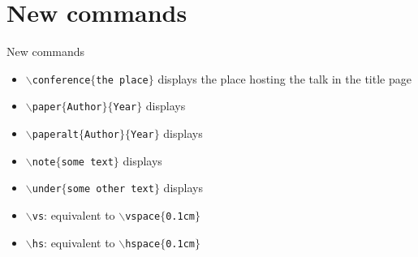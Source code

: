 \documentclass[10pt,numbering,toc,wide]{bpslides}
\begin{document}
\section{New commands}

\begin{frame}{New commands}
	\begin{itemize}
	\item \texttt{$\backslash$conference$\{$the place$\}$} displays the place hosting the talk in the title page
	\item \texttt{$\backslash$paper$\{$Author$\}\{$Year$\}$} displays 
	\item \texttt{$\backslash$paperalt$\{$Author$\}\{$Year$\}$} displays 
	\item \texttt{$\backslash$note$\{$some text$\}$} displays 
	\item \texttt{$\backslash$under$\{$some other text$\}$} displays 
	\item \texttt{$\backslash$vs}: equivalent to \texttt{$\backslash$vspace$\{$0.1cm$\}$}
	\item \texttt{$\backslash$hs}: equivalent to \texttt{$\backslash$hspace$\{$0.1cm$\}$}
	\end{itemize}
\end{frame}
\end{document}
